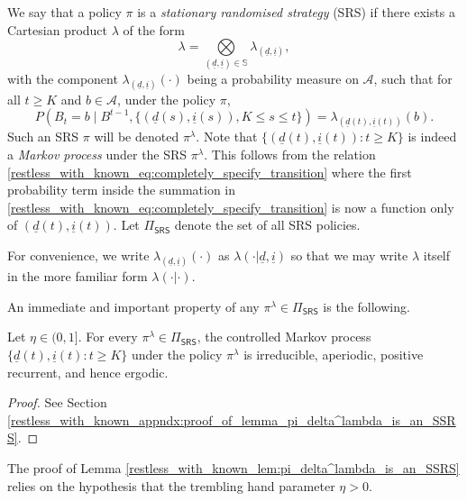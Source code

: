 We say that a policy $\pi$ is a \emph{stationary randomised strategy} (SRS) if there exists a Cartesian product $\lambda$ of the form
\begin{equation}
	\lambda=\bigotimes \limits_{(\underline{d},\underline{i})\in\mathbb{S}} \lambda_{(\underline{d},\underline{i})},\label{restless_with_known_eq:SRS_Phi_defn}
\end{equation}
with the component $\lambda_{(\underline{d},\underline{i})}(\cdot)$ being a probability measure on $\mathcal{A}$, such that for all $t\geq K$ and $b\in\mathcal{A}$, under the policy $\pi$,
\begin{equation*}
	P(B_{t} = b\mid B^{t-1}, \{ (\underline{d}(s),\underline{i}(s)),K\leq s\leq t \})=\lambda_{(\underline{d}(t),\underline{i}(t))}(b).\label{restless_with_known_eq:prob_of_arm_selection_under_SRS_Phi}
\end{equation*}
Such an SRS $\pi$ will be denoted $\pi^{\lambda}$. Note that $\{(\underline{d}(t),\underline{i}(t)):t\geq K\}$ is indeed a \emph{Markov process} under the SRS $\pi^{\lambda}$. This follows from the relation \eqref{restless_with_known_eq:completely_specify_transition} where the first probability term inside the summation in \eqref{restless_with_known_eq:completely_specify_transition} is now a function only of $(\underline{d}(t),\underline{i}(t))$. Let $\Pi_{\textsf{SRS}}$ denote the set of all SRS policies. 


For convenience, we write $\lambda_{(\underline{d},\underline{i})}(\cdot)$ as $\lambda(\cdot | \underline{d},\underline{i})$ so that we may write $\lambda$ itself in the more familiar form $\lambda(\cdot | \cdot)$.

An immediate and important property of any $\pi^\lambda\in\Pi_{\textsf{SRS}}$ is the following.

\begin{lemma}\label{restless_with_known_lem:pi_delta^lambda_is_an_SSRS}
Let $\eta\in(0,1]$. For every $\pi^{\lambda}\in\Pi_{\textsf{SRS}}$, the controlled Markov process $\{\underline{d}(t),\underline{i}(t):t\geq K\}$ under the policy $\pi^{\lambda}$ is irreducible, aperiodic, positive recurrent, and hence ergodic.
\end{lemma}
\begin{proof}
See Section \ref{restless_with_known_appndx:proof_of_lemma_pi_delta^lambda_is_an_SSRS}.
\end{proof}
The proof of Lemma \ref{restless_with_known_lem:pi_delta^lambda_is_an_SSRS}  relies on the hypothesis that the trembling hand parameter $\eta>0$. 

